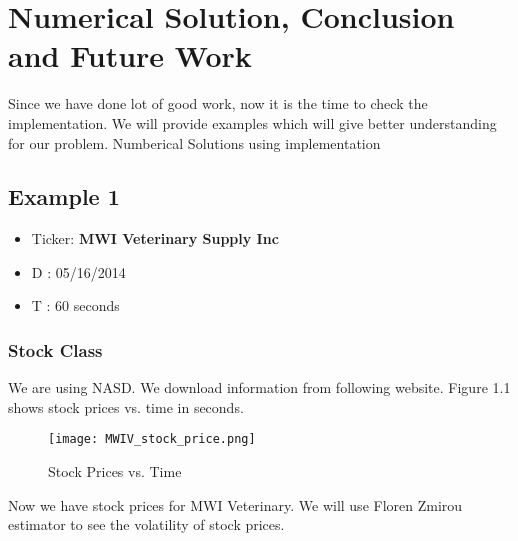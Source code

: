 \chapter{Numerical Solution, Conclusion and Future Work}
Since we have done lot of good work, now it is the time to check the implementation.
We will provide examples which will give better understanding for our problem.
{Numberical Solutions using implementation}
\section{Example 1}
\begin{itemize}
  \item Ticker: \textbf{MWI Veterinary Supply Inc}
  \item  D : 05/16/2014
  \item  T : 60 seconds
\end{itemize}
\subsection{Stock Class}
We are using NASD. We download information from following website. Figure 1.1 shows stock prices vs. time in seconds.
\begin{figure}[h]
\begin{center}
\texttt{[image: MWIV\_stock\_price.png]}
\end{center}
\caption{Stock Prices vs. Time}
\label{fig:Stock Price}
\end{figure}
\newpage
Now we have stock prices for MWI Veterinary. We will use Floren Zmirou estimator to see the volatility of stock prices.
